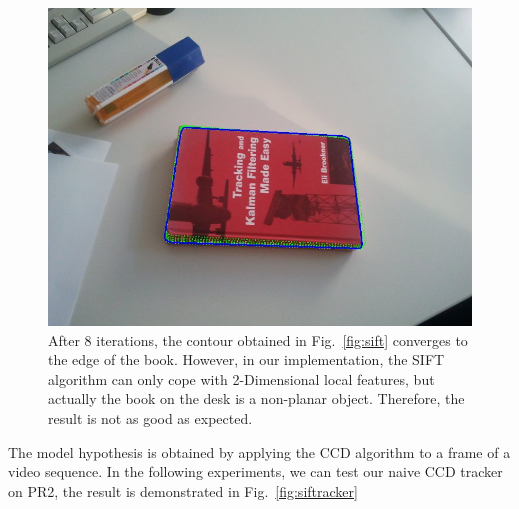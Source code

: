 \begin{figure}[htbp]
  \centering
\includegraphics[width=\linewidth]{images/sift_result.jpg}
\caption[The contour obtained using the CCD algorithm converges to the
edge of the book]{After 8 iterations, the contour obtained in Fig.~\ref{fig:sift} converges to the edge of the book. However, in our
  implementation, the SIFT algorithm can only cope with 2-Dimensional
  local features, but actually the book on the desk is a non-planar
  object. Therefore, the result is not as good as expected.}
\label{fig:sift_result}
\end{figure}

The model hypothesis is obtained by applying the CCD algorithm to a
frame of a video sequence. In the following experiments, we can test
our naive CCD tracker on PR2, the result is demonstrated in Fig.~\ref{fig:siftracker} 

